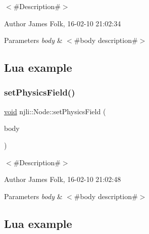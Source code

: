 $<$\#\+Description\#$>$ 

\begin{DoxyAuthor}{Author}
James Folk, 16-\/02-\/10 21\+:02\+:34
\end{DoxyAuthor}

\begin{DoxyParams}{Parameters}
{\em body} & $<$\#body description\#$>$\\
\hline
\end{DoxyParams}
\hypertarget{classnjli_1_1_steering_behavior_wander_ex1}{}\subsection{Lua example}\label{classnjli_1_1_steering_behavior_wander_ex1}

\begin{DoxyCodeInclude}
\end{DoxyCodeInclude}
\mbox{\label{classnjli_1_1_node_a825b1d962c1200848a069748356079cb}} 
\subsubsection{\texorpdfstring{set\+Physics\+Field()}{setPhysicsField()}}
{\footnotesize\ttfamily \mbox{\hyperlink{_thread_8h_af1e856da2e658414cb2456cb6f7ebc66}{void}} njli\+::\+Node\+::set\+Physics\+Field (\begin{DoxyParamCaption}\item[{\mbox{\hyperlink{classnjli_1_1_physics_field}{Physics\+Field}} $\ast$}]{body }\end{DoxyParamCaption})}



$<$\#\+Description\#$>$ 

\begin{DoxyAuthor}{Author}
James Folk, 16-\/02-\/10 21\+:02\+:48
\end{DoxyAuthor}

\begin{DoxyParams}{Parameters}
{\em body} & $<$\#body description\#$>$\\
\hline
\end{DoxyParams}
\hypertarget{classnjli_1_1_steering_behavior_wander_ex1}{}\subsection{Lua example}\label{classnjli_1_1_steering_behavior_wander_ex1}

